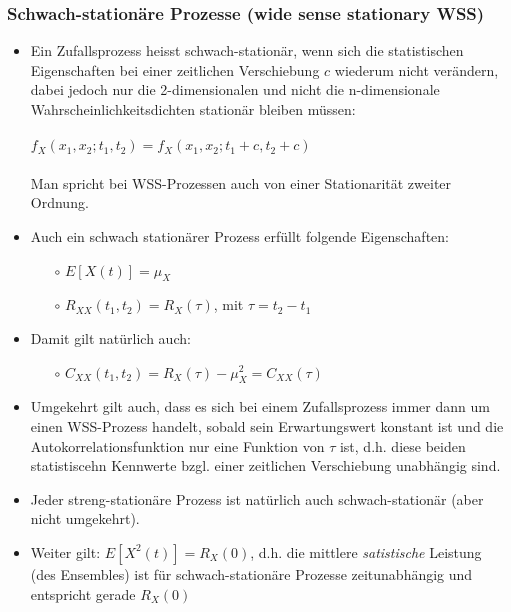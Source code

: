 \documentclass[10pt, a4paper]{article}
\begin{document}
\subsubsection{Schwach-station\"are Prozesse (wide sense stationary WSS)}
\begin{itemize}
  \item Ein Zufallsprozess heisst schwach-station\"ar, wenn sich die statistischen Eigenschaften
        bei einer zeitlichen Verschiebung $c$ wiederum nicht ver\"andern,
        dabei jedoch nur die 2-dimensionalen und nicht die n-dimensionale Wahrscheinlichkeitsdichten
        station\"ar bleiben m\"ussen: \\ \\
          $f_{X}(x_{1},x_{2};t_{1},t_{2}) = f_{X}(x_{1},x_{2};t_{1}+c,t_{2}+c) $ \\ \\
        Man spricht bei WSS-Prozessen auch von einer Stationarit\"at zweiter Ordnung.
  \item Auch ein schwach station\"arer Prozess erf\"ullt folgende Eigenschaften: 
  \begin{itemize}
     \item[$\circ$] $E[X(t)] = \mu_{X}$
     \item[$\circ$] $R_{XX}(t_{1},t_{2}) = R_{X}(\tau)$, \hspace{10pt} mit $\tau = t_{2} - t_{1}$
  \end{itemize} 
  \item Damit gilt nat\"urlich auch:
  \begin{itemize}
     \item[$\circ$] $C_{XX}(t_{1},t_{2}) = R_{X}(\tau) - \mu_{X}^{2} = C_{XX}(\tau) $
  \end{itemize} 
  \item Umgekehrt gilt auch, dass es sich bei einem Zufallsprozess immer dann um einen WSS-Prozess handelt,
        sobald sein Erwartungswert konstant ist und die Autokorrelationsfunktion nur eine Funktion von $\tau$ ist,
        d.h. diese beiden statistiscehn Kennwerte bzgl. einer zeitlichen Verschiebung unabh\"angig sind.
  \item Jeder streng-station\"are Prozess ist nat\"urlich auch schwach-station\"ar (aber nicht umgekehrt).
  \item Weiter gilt: $E[X^{2}(t)] = R_{X}(0)$, \hspace{10pt} d.h. die mittlere \textit{satistische}
        Leistung (des Ensembles) ist f\"ur schwach-station\"are Prozesse zeitunabh\"angig und
        entspricht gerade $R_{X}(0)$

\end{itemize}
\end{document}
